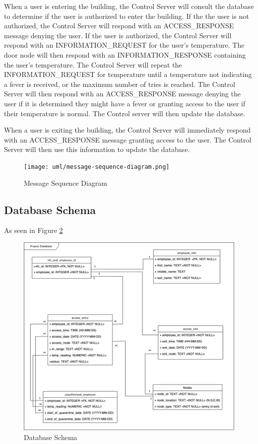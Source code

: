 When a user is entering the building, the Control Server will consult the
database to determine if the user is authorized to enter the building.  If the
the user is not authorized, the Control Server will respond with an
ACCESS\_RESPONSE message denying the user.  If the user is authorized, the
Control Server will respond with an INFORMATION\_REQUEST for the user's
temperature.  The door node will then respond with an INFORMATION\_RESPONSE
containing the user's temperature.  The Control Server will repeat the
INFORMATION\_REQUEST for temperature until a temperature not indicating a fever
is received, or the maximum number of tries is reached.  The Control Server
will then respond with an ACCESS\_RESPONSE message denying the user if it is
determined they might have a fever or granting access to the user if their
temperature is normal.  The Control server will then update the database.

When a user is exiting the building, the Control Server will immediately respond
with an ACCESS\_RESPONSE message granting access to the user.  The Control
Server will then use this information to update the database.

\begin{figure}[!htb]
\centering
\texttt{[image: uml/message-sequence-diagram.png]}
\caption{Message Sequence Diagram}
\label{fig:message-sequence-diagram}
\end{figure}

\subsection{Database Schema}

As seen in Figure \ref{fig:db-schema}

\begin{figure}[!htb]
\centering
\includegraphics[width=\textwidth]{images/db-schema.png}
\caption{Database Schema}
\label{fig:db-schema}
\end{figure}

